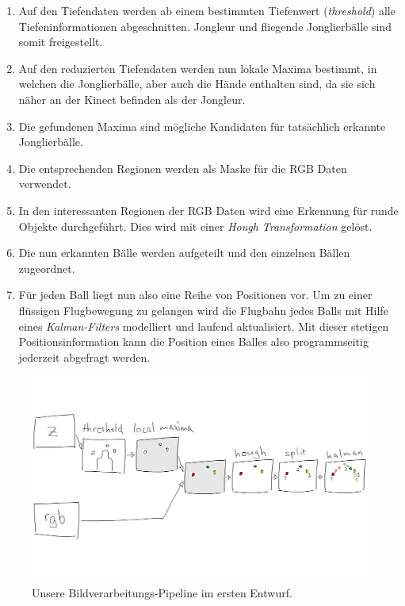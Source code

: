 \documentclass[12pt,a4paper,ngerman]{scrartcl}
\begin{document}
\begin{enumerate}
\item Auf den Tiefendaten werden ab einem bestimmten Tiefenwert (\textit{threshold})
	alle Tiefeninformationen abgeschnitten. Jongleur und fliegende Jonglierbälle sind
	somit freigestellt.
\item Auf den reduzierten Tiefendaten werden nun lokale Maxima bestimmt, in welchen die
	Jonglierbälle, aber auch die Hände enthalten sind, da sie sich näher an der Kinect befinden als der
	Jongleur.
\item Die gefundenen Maxima sind mögliche Kandidaten für tatsächlich erkannte
	Jonglierbälle.
\item Die entsprechenden Regionen werden als Maske für die RGB Daten verwendet.
\item In den interessanten Regionen der RGB Daten wird eine Erkennung für runde
	Objekte durchgeführt. Dies wird mit einer \textit{Hough Transformation} gelöst.
\item Die nun erkannten Bälle werden aufgeteilt und den einzelnen Bällen zugeordnet.
\item Für jeden Ball liegt nun also eine Reihe von Positionen vor. Um zu einer
	flüssigen Flugbewegung zu gelangen wird die Flugbahn jedes Balls mit Hilfe eines
	\textit{Kalman-Filters} modelliert und laufend aktualisiert. Mit dieser stetigen
	Positionsinformation kann die Position eines Balles also programmseitig jederzeit
	abgefragt werden.
\end{enumerate}

\begin{figure}[H]
    \centering
    \includegraphics[scale=0.14]{img/processing-pipeline.png}
    \caption{Unsere Bildverarbeitungs-Pipeline im ersten Entwurf.}
    \label{ourpipeline}
\end{figure}
\end{document}
